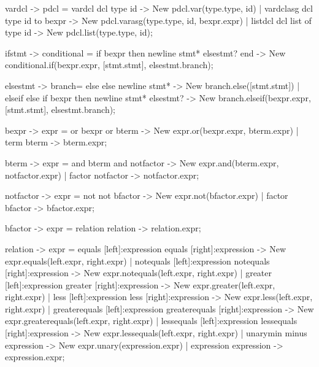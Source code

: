     vardcl      {-> pdcl}   =   {vardcl} dcl type id                                    {-> New pdcl.var(type.type, id)}
                            |   {vardclasg} dcl type id to bexpr                        {-> New pdcl.varasg(type.type, id, bexpr.expr)}
                            |   {listdcl} dcl list of type id                           {-> New pdcl.list(type.type, id)};

    ifstmt      {-> conditional} =   if bexpr then newline stmt* elsestmt? end               {-> New conditional.if(bexpr.expr, [stmt.stmt], elsestmt.branch)};

    elsestmt    {-> branch}=   {else} else newline stmt*                              {-> New branch.else([stmt.stmt])}
                             |   {elseif} else if bexpr then newline stmt* elsestmt?    {-> New branch.elseif(bexpr.expr, [stmt.stmt], elsestmt.branch)};


    bexpr       {-> expr}   =   {or} bexpr or bterm                                     {-> New expr.or(bexpr.expr, bterm.expr)}
                            |   {term} bterm                                            {-> bterm.expr};

    bterm       {-> expr}   =   {and} bterm and notfactor                               {-> New expr.and(bterm.expr, notfactor.expr)}
                            |   {factor} notfactor                                      {-> notfactor.expr};

    notfactor   {-> expr}   =   {not} not bfactor                                       {-> New expr.not(bfactor.expr)}
                            |   {factor} bfactor                                        {-> bfactor.expr};

    bfactor     {-> expr}   =   {relation} relation                                     {-> relation.expr};

    relation    {-> expr}   =   {equals} [left]:expression equals [right]:expression                {-> New expr.equals(left.expr, right.expr)}
                            |   {notequals} [left]:expression notequals [right]:expression          {-> New expr.notequals(left.expr, right.expr)}
                            |   {greater} [left]:expression greater [right]:expression              {-> New expr.greater(left.expr, right.expr)}
                            |   {less} [left]:expression less [right]:expression                    {-> New expr.less(left.expr, right.expr)}
                            |   {greaterequals} [left]:expression greaterequals [right]:expression  {-> New expr.greaterequals(left.expr, right.expr)}
                            |   {lessequals} [left]:expression lessequals [right]:expression        {-> New expr.lessequals(left.expr, right.expr)}
                            |   {unarymin} minus expression                                         {-> New expr.unary(expression.expr)}
                            |   {expression} expression                                             {-> expression.expr};

